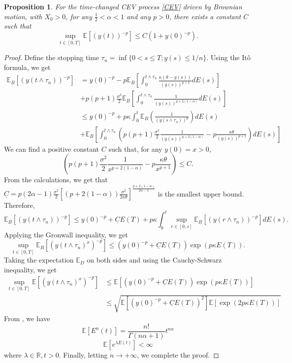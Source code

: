 \documentclass[10pt,reqno,final]{amsart}
\theoremstyle{plain}
\newtheorem{proposition}{Proposition}[section]
\theoremstyle{definition}
\theoremstyle{remark}
\numberwithin{equation}{section}
\numberwithin{figure}{section}
\numberwithin{table}{section}
\begin{document}
\begin{proposition}
	For the time-changed CEV process \cref{CEV} driven by Brownian motion, with $X_0>0$, for any $\frac{1}{2} < \alpha < 1$ and any $p > 0$, there exists a constant $C$ such that
	\begin{equation*}
		\sup\limits_{t\in[0, T]} \mathbb{E}\left[\left(y(t)\right)^{-p}\right] \leq C(1 + y(0)^{-p}).
	\end{equation*}
\end{proposition}
\begin{proof}
	Define the stopping time $\tau_{n}=\inf\{0 < s \leq T; y(s) \leq 1/n\}$. Using the Itô formula, we get
	$$\begin{aligned}
		\mathbb{E}_B\left[(y(t\wedge\tau_{n}))^{-p}\right] &= y(0)^{-p} - p \mathbb{E}_B\left[\int_{0}^{t\wedge\tau_{n}} \frac{\kappa(\theta-y(s))}{(y(s))^{p+1}} dE(s)\right] \\
		&+ p(p+1) \frac{\sigma^{2}}{2} \mathbb{E}_B\left[\int_{0}^{t\wedge\tau_{n}} \frac{1}{(y(s))^{p+2(1-\alpha)}} dE(s)\right] \\
		&\leq y(0)^{-p} + p\kappa \int_{0}^{t} \mathbb{E}_B\left(\frac{1}{(y(s\wedge\tau_{n}))^{p}}\right)dE(s) \\
		&+ \mathbb{E}_B\left[\int_0^{t\wedge\tau_n}\left(p(p+1)\frac{\sigma^2}{2}\frac{1}{(y(s))^{p+2(1-\alpha)}}-p\frac{\kappa\theta}{(y(s))^{p+1}}\right)dE(s)\right]
	\end{aligned}$$
	We can find a positive constant $C$ such that, for any $y(0)=x > 0$,
	$$\left(p(p+1)\frac{\sigma^2}{2}\frac{1}{x^{p+2(1-\alpha)}}-p\frac{\kappa\theta}{x^{p+1}}\right) \leq C.$$
	From the calculations, we get that $\underline C = p(2\alpha-1)\frac{\sigma^2}{2}\left[(p+2(1-\alpha))\frac{\sigma^2}{2\kappa\theta}\right]^{\frac{p+2(1-\alpha)}{2\alpha-1}}$ is the smallest upper bound. Therefore,
	$$\mathbb{E}_B\left[(y(t\wedge\tau_n))^{-p}\right] \leq y(0)^{-p} + \underline{C}E(T) + p\kappa \int_0^t \sup_{r\in[0, s]} \mathbb{E}_B\left[(y(r\wedge\tau_n))^{-p}\right] dE(s).$$
	Applying the Gronwall inequality, we get
	$$\sup\limits_{t\in[0, T]} \mathbb{E}_B\left[(y(t\wedge\tau_n)^x)^{-p}\right] \leq \left(y(0)^{-p} + \underline{C}E(T)\right) \exp(p\kappa E(T)).$$
	Taking the expectation $\mathbb{E}_D$ on both sides and using the Cauchy-Schwarz inequality, we get
	$$\begin{aligned}
		\sup\limits_{t\in[0, T]} \mathbb{E}\left[(y(t\wedge\tau_n)^x)^{-p}\right] &\leq \mathbb{E}\left[\left(y(0)^{-p} + \underline{C}E(T)\right) \exp(p\kappa E(T))\right] \\
		&\leq \sqrt{\mathbb{E}\left[\left(y(0)^{-p} + \underline{C}E(T)\right)^2\right]\mathbb{E}\left[\exp(2p\kappa E(T))\right]}
	\end{aligned}$$
	From \cite{jum2014strong}, we have
	\begin{equation}
		\mathbb{E}[E^n(t)] = \frac{n!}{\Gamma(n\alpha+1)}t^{n\alpha}
	\end{equation}
	\begin{equation}
		\mathbb{E}[e^{\lambda E(t)}] < \infty
	\end{equation}
	where $\lambda \in \mathbb{R}, t>0$. Finally, letting $n \to +\infty$, we complete the proof.
\end{proof}
\end{document}

